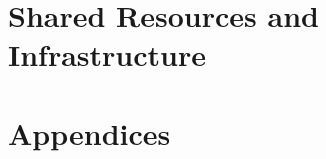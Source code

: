 \documentclass[12pt,a4paper]{report}
\begin{document}
\chapter{Shared Resources and Infrastructure}









\chapter{Appendices}




\end{document}
